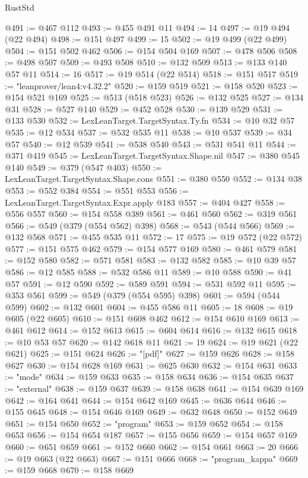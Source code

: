 \begin{lexlean}{RustStd}
\begin{coremodule}
{\begin{coremodule}
{{{{{{{{{{{{{{{{{{{{{{{{{{{{{{{{{{{{{{{{{{{{{{{{{{{{{{{{{{{{{{{{{{{{{{{{{{{{{{{{@491 := @467 @112
@493 := @455 @491 @11
@494 := 14
@497 := @19 @494 (@22 @494)
@498 := @151 @497
@499 := 15
@502 := @19 @499 (@22 @499)
@504 := @151 @502 @462
@506 := @154 @504 @169
@507 := @478 @506
@508 := @498 @507
@509 := @493 @508
@510 := @132 @509
@513 := @133 @140 @57 @11
@514 := 16
@517 := @19 @514 (@22 @514)
@518 := @151 @517
@519 := "leanprover/lean4:v4.32.2"
@520 := @159 @519
@521 := @158 @520
@523 := @154 @521 @169
@525 := @513 (@518 @523)
@526 := @132 @525
@527 := @134 @31
@528 := @527 @140
@529 := @452 @528
@530 := @139 @529
@531 := @133 @530
@532 := LexLeanTarget.TargetSyntax.Ty.fn
@534 := @10 @32 @57
@535 := @12 @534
@537 := @532 @535 @11
@538 := @10 @537
@539 := @34 @57
@540 := @12 @539
@541 := @538 @540
@543 := @531 @541 @11
@544 := @371 @419
@545 := LexLeanTarget.TargetSyntax.Shape.nil
@547 := @380 @545 @140
@549 := @379 (@547 @403)
@550 := LexLeanTarget.TargetSyntax.Shape.cons
@551 := @380 @550
@552 := @134 @38
@553 := @552 @384
@554 := @551 @553
@556 := LexLeanTarget.TargetSyntax.Expr.apply @183
@557 := @404 @427
@558 := @556 @557
@560 := @154 @558 @389
@561 := @461 @560
@562 := @319 @561
@566 := @549 (@379 (@554 @562) @398)
@568 := @543 (@544 @566)
@569 := @132 @568
@571 := @455 @535 @11
@572 := 17
@575 := @19 @572 (@22 @572)
@577 := @151 @575 @462
@579 := @154 @577 @169
@580 := @461 @579
@581 := @152 @580
@582 := @571 @581
@583 := @132 @582
@585 := @10 @39 @57
@586 := @12 @585
@588 := @532 @586 @11
@589 := @10 @588
@590 := @41 @57
@591 := @12 @590
@592 := @589 @591
@594 := @531 @592 @11
@595 := @353 @561
@599 := @549 (@379 (@554 @595) @398)
@601 := @594 (@544 @599)
@602 := @132 @601
@604 := @455 @586 @11
@605 := 18
@608 := @19 @605 (@22 @605)
@610 := @151 @608 @462
@612 := @154 @610 @169
@613 := @461 @612
@614 := @152 @613
@615 := @604 @614
@616 := @132 @615
@618 := @10 @53 @57
@620 := @142 @618 @11
@621 := 19
@624 := @19 @621 (@22 @621)
@625 := @151 @624
@626 := "[pdf]"
@627 := @159 @626
@628 := @158 @627
@630 := @154 @628 @169
@631 := @625 @630
@632 := @154 @631
@633 := "mode"
@634 := @159 @633
@635 := @158 @634
@636 := @154 @635
@637 := "external"
@638 := @159 @637
@639 := @158 @638
@641 := @154 @639 @169
@642 := @164 @641
@644 := @154 @642 @169
@645 := @636 @644
@646 := @155 @645
@648 := @154 @646 @169
@649 := @632 @648
@650 := @152 @649
@651 := @154 @650
@652 := "program"
@653 := @159 @652
@654 := @158 @653
@656 := @154 @654 @187
@657 := @155 @656
@659 := @154 @657 @169
@660 := @651 @659
@661 := @152 @660
@662 := @154 @661
@663 := 20
@666 := @19 @663 (@22 @663)
@667 := @151 @666
@668 := "program_kappa"
@669 := @159 @668
@670 := @158 @669
}}}}}}}}}}}}}}}}}}}}}}}}}}}}}}}}}}}}}}}}}}}}}}}}}}}}}}}}}}}}}}}}}}}}}}}}}}}}}}}}
\end{coremodule}}
\end{coremodule}
\end{lexlean}
